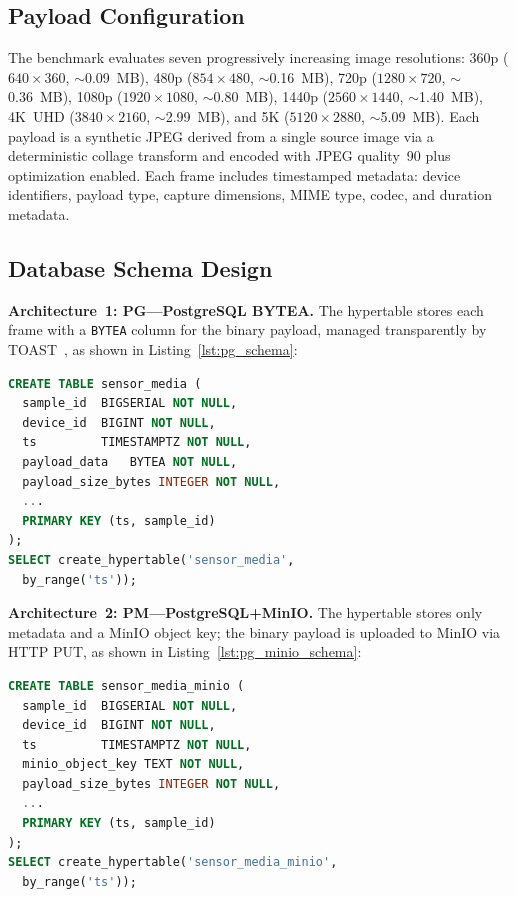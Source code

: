 \documentclass[conference]{IEEEtran}
\begin{document}
\subsection{Payload Configuration}
The benchmark evaluates seven progressively increasing image resolutions: 360p ($640{\times}360$, $\sim$0.09~MB), 480p ($854{\times}480$, $\sim$0.16~MB), 720p ($1280{\times}720$, $\sim$0.36~MB), 1080p ($1920{\times}1080$, $\sim$0.80~MB), 1440p ($2560{\times}1440$, $\sim$1.40~MB), 4K~UHD ($3840{\times}2160$, $\sim$2.99~MB), and 5K ($5120{\times}2880$, $\sim$5.09~MB). Each payload is a synthetic JPEG derived from a single source image via a deterministic collage transform and encoded with JPEG quality~90 plus optimization enabled. Each frame includes timestamped metadata: device identifiers, payload type, capture dimensions, MIME type, codec, and duration metadata.

\subsection{Database Schema Design}
\textbf{Architecture~1: PG---PostgreSQL BYTEA.} The hypertable stores each frame with a \texttt{BYTEA} column for the binary payload, managed transparently by TOAST~\cite{postgresql_toast_docs}, as shown in Listing~\ref{lst:pg_schema}:

\begin{lstlisting}[language=SQL,basicstyle=\ttfamily\scriptsize,breaklines=true,caption={PG schema: inline BYTEA storage.},label={lst:pg_schema}]
CREATE TABLE sensor_media (
  sample_id  BIGSERIAL NOT NULL,
  device_id  BIGINT NOT NULL,
  ts         TIMESTAMPTZ NOT NULL,
  payload_data   BYTEA NOT NULL,
  payload_size_bytes INTEGER NOT NULL,
  ...
  PRIMARY KEY (ts, sample_id)
);
SELECT create_hypertable('sensor_media',
  by_range('ts'));
\end{lstlisting}

\textbf{Architecture~2: PM---PostgreSQL+MinIO.} The hypertable stores only metadata and a MinIO object key; the binary payload is uploaded to MinIO via HTTP PUT, as shown in Listing~\ref{lst:pg_minio_schema}:

\begin{lstlisting}[language=SQL,basicstyle=\ttfamily\scriptsize,breaklines=true,caption={PM schema: externalized MinIO storage.},label={lst:pg_minio_schema}]
CREATE TABLE sensor_media_minio (
  sample_id  BIGSERIAL NOT NULL,
  device_id  BIGINT NOT NULL,
  ts         TIMESTAMPTZ NOT NULL,
  minio_object_key TEXT NOT NULL,
  payload_size_bytes INTEGER NOT NULL,
  ...
  PRIMARY KEY (ts, sample_id)
);
SELECT create_hypertable('sensor_media_minio',
  by_range('ts'));
\end{lstlisting}
\end{document}

